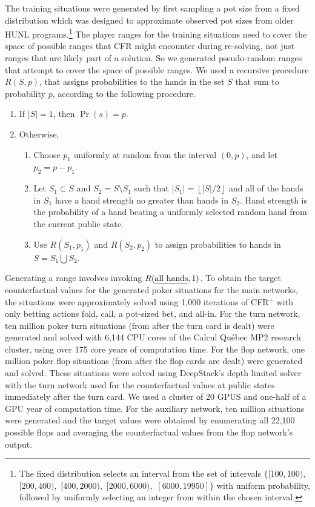 The training situations were generated by first sampling a pot size from a fixed distribution which was designed to approximate observed pot sizes from older HUNL programs.\footnote{The fixed distribution selects an interval from the set of intervals $\{[100, 100),$ $[200,400),$ $[400, 2000),$ $[2000, 6000),$ $[6000, 19950]\}$ with uniform probability, followed by uniformly selecting an integer from within the chosen interval.}
The player ranges for the training situations need to cover the space of possible ranges that CFR might encounter during re-solving, not just ranges that are likely part of a solution.  So we generated pseudo-random ranges that attempt to cover the space of possible ranges.  We used a recursive procedure $R(S, p)$, that assigns probabilities to the hands in the set $S$ that sum to probability $p$, according to the following procedure.
\begin{enumerate}
\item If $|S| =1$, then $\Pr(s) = p$.
\item Otherwise,
\begin{enumerate}
\item Choose $p_1$ uniformly at random from the interval $(0, p)$, and let $p_2 = p-p_1$.
\item Let $S_1 \subset S$ and $S_2 = S \setminus S_1$ such that $|S_1| = \left\lfloor|S|/2\right\rfloor$ and all of the hands in $S_1$ have a hand strength no greater than hands in $S_2$.  Hand strength is the probability of a hand beating a uniformly selected random hand from the current public state.
\item Use $R(S_1, p_1)$ and $R(S_2, p_2)$ to assign probabilities to hands in $S=S_1 \bigcup S_2$.
\end{enumerate}
\end{enumerate}
Generating a range involves invoking $R(\mbox{\em all hands}, 1)$.
To obtain the target counterfactual values for the generated poker situations for the main networks, the situations were approximately solved using 1,000 iterations of CFR$^+$ with only betting actions fold, call, a pot-sized bet, and all-in.  For the turn network, ten million poker turn situations (from after the turn card is dealt) were generated and solved with 6,144 CPU cores of the Calcul Qu\'{e}bec MP2 research cluster, using over 175 core years of computation time.  For the flop network, one million poker flop situations (from after the flop cards are dealt) were generated and solved.  These situations were solved using DeepStack's depth limited solver with the turn network used for the counterfactual values at public states immediately after the turn card.  We used a cluster of 20 GPUS and one-half of a GPU year of computation time.  For the auxiliary network, ten million situations were generated and the target values were obtained by enumerating all 22,100 possible flops and averaging the counterfactual values from the flop network's output.  

